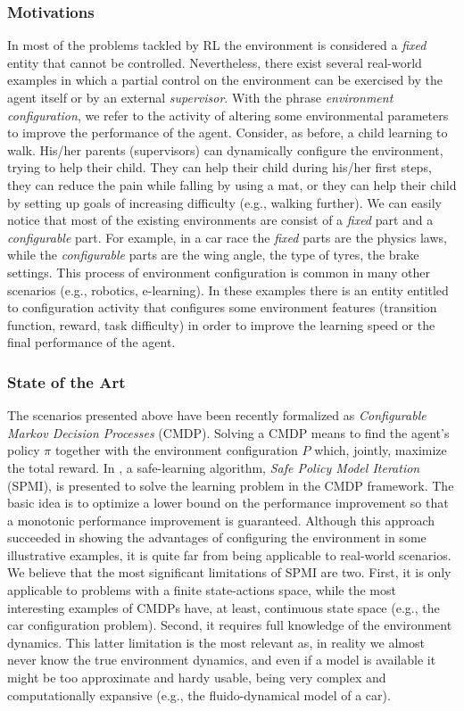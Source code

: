 \subsubsection{Motivations}
In most of the problems tackled by RL the environment is considered a \textit{fixed} entity that cannot be controlled. Nevertheless, there exist several real-world examples in which a partial control on the environment can be exercised by the agent itself or by an external \textit{supervisor}. 
With the phrase \textit{environment configuration}, we refer to the activity of altering some environmental parameters to improve the performance of the agent.
Consider, as before, a child learning to walk. His/her parents (supervisors) can dynamically configure the environment, trying to help their child. They can help their child during his/her first steps, they can reduce the pain while falling by using a mat, or they can help their child by setting up goals of increasing difficulty (e.g., walking further). \newline
We can easily notice that most of the existing environments are consist of a \textit{fixed} part and a \textit{configurable} part. For example, in a car race the \textit{fixed} parts are the physics laws, while the \textit{configurable} parts are the wing angle, the type of tyres, the brake settings.
This process of environment configuration is common in many other scenarios (e.g., robotics, e-learning).  \newline
In these examples there is an entity entitled to configuration activity that configures some environment features (transition function, reward, task difficulty) in order to improve the learning speed or the final performance of the agent.
\subsubsection{State of the Art}
The scenarios presented above have been recently formalized as \textit{Configurable Markov Decision Processes} \citep{cmdp} (CMDP). Solving a CMDP means to find the agent's policy $\pi$ together with the environment configuration $P$ which, jointly, maximize the total reward. In  \citep{cmdp}, a safe-learning algorithm, \textit{Safe Policy Model Iteration} (SPMI), is presented to solve the learning problem in the CMDP framework. The basic idea is to optimize a lower bound on the performance improvement so that a monotonic performance improvement is guaranteed. Although this approach succeeded in showing the advantages of configuring the environment in some illustrative examples, it is quite far from being applicable to real-world scenarios. We believe that the most significant limitations of SPMI are two. First, it is only applicable to problems with a finite state-actions space, while the most interesting examples of CMDPs have, at least, continuous state space (e.g., the car configuration problem). Second, it requires full knowledge of the environment dynamics. This latter limitation is the most relevant as, in reality we almost never know the true environment dynamics, and even if a model is available it might be too approximate and hardy usable, being very complex and computationally expansive (e.g., the fluido-dynamical model of a car).
